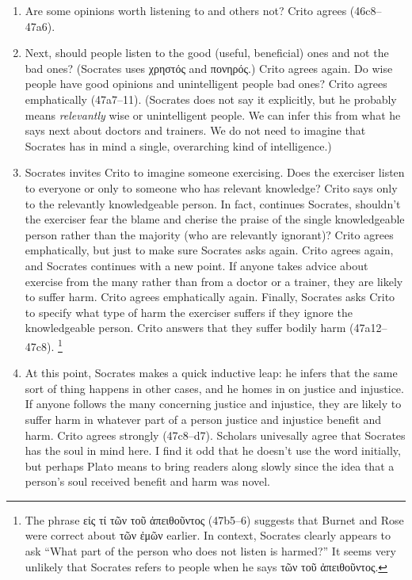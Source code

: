 \documentclass[12pt,letterpaper]{article}
\begin{document}
\begin{enumerate}

    \item Are some opinions worth listening to and others not?
        Crito agrees (46c8--47a6).

    \item Next, should people listen to the good (useful, beneficial) ones and not the bad ones?
        (Socrates uses \textgreek{χρηστός} and \textgreek{πονηρός}.)
        Crito agrees again.
        Do wise people have good opinions and unintelligent people bad ones?
        Crito agrees emphatically (47a7--11).
        (Socrates does not say it explicitly, but he probably means \textit{relevantly} wise or unintelligent people.
        We can infer this from what he says next about doctors and trainers.
        We do not need to imagine that Socrates has in mind a single, overarching kind of intelligence.)

    \item Socrates invites Crito to imagine someone exercising.
        Does the exerciser listen to everyone or only to someone who has relevant knowledge?
        Crito says only to the relevantly knowledgeable person.
        In fact, continues Socrates, shouldn't the exerciser fear the blame and cherise the praise of the single knowledgeable person rather than the majority (who are relevantly ignorant)?
        Crito agrees emphatically, but just to make sure Socrates asks again.
        Crito agrees again, and Socrates continues with a new point.
        If anyone takes advice about exercise from the many rather than from a doctor or a trainer, they are likely to suffer harm.
        Crito agrees emphatically again.
        Finally, Socrates asks Crito to specify what type of harm the exerciser suffers if they ignore the knowledgeable person.
        Crito answers that they suffer bodily harm (47a12--47c8).%
\footnote{The phrase \textgreek{εἰς τί τῶν τοῦ ἀπειθοῦντος} (47b5--6) suggests that Burnet and Rose were correct about \textgreek{τῶν ἐμῶν} earlier.
        In context, Socrates clearly appears to ask ``What part of the person who does not listen is harmed?''
        It seems very unlikely that Socrates refers to people when he says \textgreek{τῶν τοῦ ἀπειθοῦντος}.}

    \item At this point, Socrates makes a quick inductive leap: he infers that the same sort of thing happens in other cases, and he homes in on justice and injustice.
        If anyone follows the many concerning justice and injustice, they are likely to suffer harm in whatever part of a person justice and injustice benefit and harm.
        Crito agrees strongly (47c8--d7).
        Scholars univesally agree that Socrates has the soul in mind here.
        I find it odd that he doesn't use the word initially, but perhaps Plato means to bring readers along slowly since the idea that a person's soul received benefit and harm was novel.


\end{enumerate}
\end{document}
